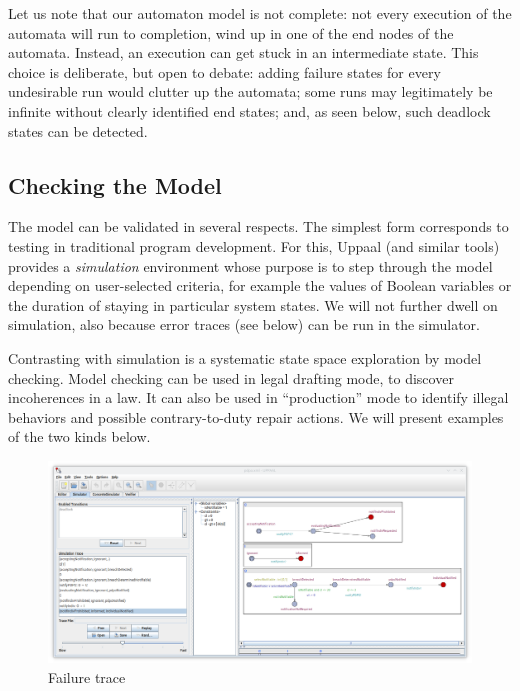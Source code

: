 Let us note that our automaton model is not complete: not every execution of
the automata will run to completion, \ie{} wind up in one of the end nodes of
the automata. Instead, an execution can get stuck in an intermediate
state. This choice is deliberate, but open to debate: adding failure states
for every undesirable run would clutter up the automata; some runs may
legitimately be infinite without clearly identified end states; and, as seen
below, such deadlock states can be detected.

\subsection{Checking the Model}\label{sec:checking_the_model}

The model can be validated in several respects. The simplest form corresponds
to testing in traditional program development. For this, Uppaal (and similar
tools) provides a \emph{simulation} environment whose purpose is to step
through the model depending on user-selected criteria, for example the values
of Boolean variables or the duration of staying in particular system
states. We will not further dwell on simulation, also because error traces
(see below) can be run in the simulator.

Contrasting with simulation is a systematic state space exploration by model
checking. Model checking can be used in legal drafting mode, to discover
incoherences in a law. It can also be used in ``production'' mode to identify
illegal behaviors and possible contrary-to-duty repair actions. We will
present examples of the two kinds below.

\begin{figure}[htp]
\centering
\includegraphics[width=\textwidth]{Figures/pdpa_trace.png}
\caption{Failure trace}\label{fig:pdpa_trace}
\end{figure}

